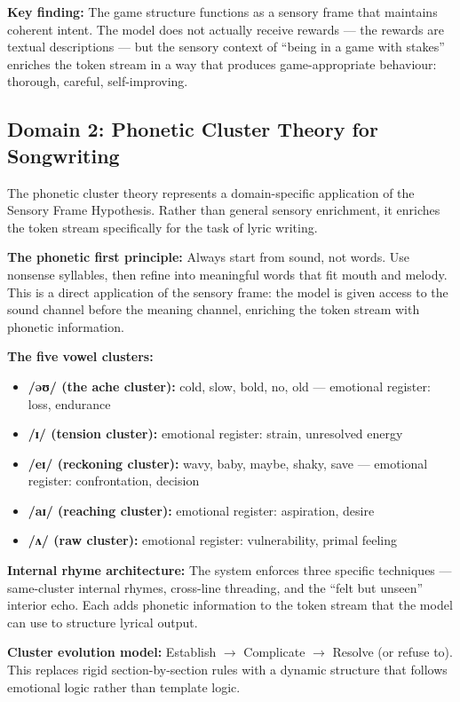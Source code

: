 \documentclass[11pt,a4paper]{article}
\begin{document}
\textbf{Key finding:} The game structure functions as a sensory frame that maintains coherent intent. The model does not actually receive rewards --- the rewards are textual descriptions --- but the sensory context of ``being in a game with stakes'' enriches the token stream in a way that produces game-appropriate behaviour: thorough, careful, self-improving.

\subsection{Domain 2: Phonetic Cluster Theory for Songwriting}

The phonetic cluster theory represents a domain-specific application of the Sensory Frame Hypothesis. Rather than general sensory enrichment, it enriches the token stream specifically for the task of lyric writing.

\textbf{The phonetic first principle:} Always start from sound, not words. Use nonsense syllables, then refine into meaningful words that fit mouth and melody. This is a direct application of the sensory frame: the model is given access to the sound channel before the meaning channel, enriching the token stream with phonetic information.

\textbf{The five vowel clusters:}

\begin{itemize}
    \item \textbf{/əʊ/ (the ache cluster):} cold, slow, bold, no, old --- emotional register: loss, endurance
    \item \textbf{/ɪ/ (tension cluster):} emotional register: strain, unresolved energy
    \item \textbf{/eɪ/ (reckoning cluster):} wavy, baby, maybe, shaky, save --- emotional register: confrontation, decision
    \item \textbf{/aɪ/ (reaching cluster):} emotional register: aspiration, desire
    \item \textbf{/ʌ/ (raw cluster):} emotional register: vulnerability, primal feeling
\end{itemize}

\textbf{Internal rhyme architecture:} The system enforces three specific techniques --- same-cluster internal rhymes, cross-line threading, and the ``felt but unseen'' interior echo. Each adds phonetic information to the token stream that the model can use to structure lyrical output.

\textbf{Cluster evolution model:} Establish $\rightarrow$ Complicate $\rightarrow$ Resolve (or refuse to). This replaces rigid section-by-section rules with a dynamic structure that follows emotional logic rather than template logic.
\end{document}
